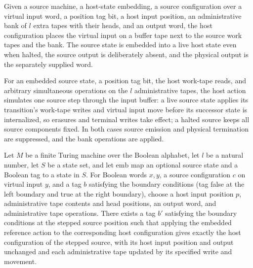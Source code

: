 \begin{definition}
\label{Complexity.clRefCfg}
\leanok
{}
Given a source machine, a host-state embedding, a source configuration over a virtual input word, a position tag bit, a host input position, an administrative bank of $l$ extra tapes with their heads, and an output word, the host configuration places the virtual input on a buffer tape next to the source work tapes and the bank. The source state is embedded into a live host state even when halted, the source output is deliberately absent, and the physical output is the separately supplied word.
\end{definition}

\begin{definition}
\label{Complexity.clRefAction}
\leanok
{}
For an embedded source state, a position tag bit, the host work-tape reads, and arbitrary simultaneous operations on the $l$ administrative tapes, the host action simulates one source step through the input buffer: a live source state applies its transition's work-tape writes and virtual input move before its successor state is internalized, so erasures and terminal writes take effect; a halted source keeps all source components fixed. In both cases source emission and physical termination are suppressed, and the bank operations are applied.
\end{definition}

\begin{lemma}
\label{Complexity.clRef_apply}
\leanok
{}
Let $M$ be a finite Turing machine over the Boolean alphabet, let $l$ be a natural
number, let $S$ be a state set, and let $\mathrm{emb}$ map an optional source state and
a Boolean tag to a state in $S$. For Boolean words $x,y$, a source configuration $c$ on
virtual input $y$, and a tag $b$ satisfying the boundary conditions (tag false at the
left boundary and true at the right boundary), choose a host input position $p$,
administrative tape contents and head positions, an output word, and administrative tape
operations. There exists a tag $b'$ satisfying the boundary conditions at the stepped
source position such that applying the embedded reference action to the corresponding
host configuration gives exactly the host configuration of the stepped source, with its
host input position and output unchanged and each administrative tape updated by its
specified write and movement.
\end{lemma}

